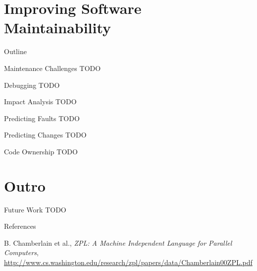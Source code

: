 

\section{Improving Software Maintainability}

\begin{frame}{Outline}
  \tableofcontents[current]
\end{frame}


\begin{frame}{Maintenance Challenges}
  TODO
\end{frame}


\begin{frame}{Debugging}
  TODO
\end{frame}


\begin{frame}{Impact Analysis}
  TODO
\end{frame}


\begin{frame}{Predicting Faults}
  TODO
\end{frame}


\begin{frame}{Predicting Changes}
  TODO
\end{frame}


\begin{frame}{Code Ownership}
  TODO
\end{frame}



\section*{Outro}

\begin{frame}{Future Work}
  TODO
\end{frame}


\begin{frame}{References}
  \begin{thebibliography}{10}
    \beamertemplatearticlebibitems
    
    B. Chamberlain et al., {\em ZPL: A Machine Independent Language
      for Parallel Computers},
    \url{http://www.cs.washington.edu/research/zpl/papers/data/Chamberlain00ZPL.pdf}
  \end{thebibliography}
\end{frame}

